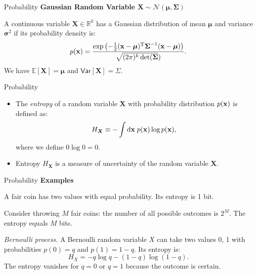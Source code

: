 \documentclass[10pt]{beamer}
\newcommand{\emphbox}[1]{%
\noindent\colorbox{shade}{%
\begin{minipage}{\dimexpr\linewidth-2\fboxsep}#1\end{minipage}}}
\begin{document}
\begin{frame}{Probability}
\textbf{Gaussian Random Variable $\boldsymbol{X} \sim \mathcal{N}(\boldsymbol{\mu}, \boldsymbol{\Sigma})$}\vspace{0.2cm}
\emphbox{A continuous variable $\boldsymbol{X}\in\mathbb{R}^k$ has a Gaussian distribution of mean $\boldsymbol{\mu}$ and variance $\boldsymbol{\sigma}^2$ if its probability density is:
\begin{equation}
  p({\bf x}) = \frac{\exp\left(-\frac{1}{2}({\bf x}-\boldsymbol{\mu})^{\mathrm{T}}\boldsymbol{\Sigma}^{-1}({\bf x}-\boldsymbol{\mu})\right)}{\sqrt{(2\pi)^k\det(\boldsymbol{\Sigma}})}.
\end{equation}
We have $\mathbb{E}[\boldsymbol{X}]=\boldsymbol{\mu}$ and $\textsf{Var}[\boldsymbol{X}]=\Sigma.$
}
\end{frame}

\begin{frame}{Probability}
\begin{itemize}
\setlength\itemsep{1em}
  \item The \textit{entropy} of a random variable $\boldsymbol{X}$ with probability distribution $p({\bf x})$ is defined as:
  \begin{equation}
    H_{\boldsymbol{X}} \equiv - \int\mathrm{d}{\bf x}\; p({\bf x})\log p({\bf x}),
  \end{equation}
  where we define $0\log 0=0$.

  \item Entropy $H_{\boldsymbol{X}}$ is a measure of uncertainty of the random variable $\boldsymbol{X}$.
\end{itemize}
\end{frame}

\begin{frame}{Probability}
\textbf{Examples}\vspace{0.2cm}
\emphbox{%
  A fair coin has two values with equal probability. Its entropy is 1 bit.
}%
\vspace{0.2cm}
\emphbox{%
  Consider throwing $M$ fair coins: the number of all possible outcomes is $2^M$. The entropy equals $M$ bits.
}%
\vspace{0.2cm}
\emphbox{%
  \textit{Bernoulli process.} A Bernoulli random variable $X$ can take two values 0, 1 with probabilities $p(0)=q$ and $p(1)=1-q$. Its entropy is:
  \begin{equation}
    H_X = -q\log q - (1-q)\log(1-q).
  \end{equation}
  The entropy vanishes for $q=0$ or $q=1$ because the outcome is certain.
}
\end{frame}
\end{document}
